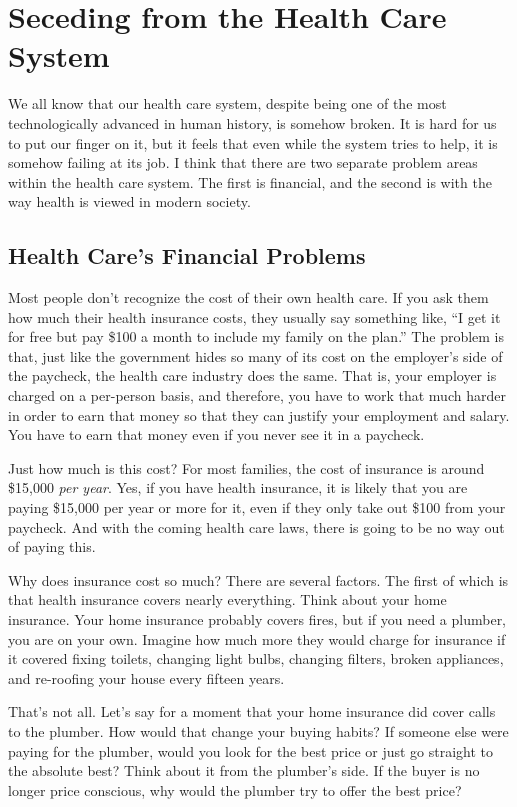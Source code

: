
\chapter{Seceding from the Health Care System}


We all know that our health care system, despite being one of the most
technologically advanced in human history, is somehow broken. It is
hard for us to put our finger on it, but it feels that even while
the system tries to
help, it is somehow failing at its job. I think that there are two
separate problem areas within the health care system. The first is
financial, and the second is with the way health is viewed in modern
society.

\section{Health Care’s Financial Problems}

Most people don’t recognize the cost of their own health care. If you
ask them how much their health insurance costs, they usually say
something like, “I get it for free but pay \$100 a month to include my
family on the plan.”  The problem is that, just like the government
hides so many of its cost on the employer’s side of the paycheck, the
health care industry does the same. That is, your employer is charged
on a per-person basis, and therefore, you have to work that much harder
in order to earn that money
so that they can
justify your employment and salary. You have to earn that money even if
you never see it in a paycheck.


Just how much is this cost?  For most families, the cost of insurance is
around \$15,000 \textit{per year}. Yes, if you have health insurance,
it is likely that you are paying \$15,000 per year or more for it, even
if they only take out \$100 from your paycheck. And with the coming
health care laws, there is going to be no way out of paying this.


Why does insurance cost so much?  There are several
factors. The first of
which is that health insurance covers nearly everything. Think about
your home insurance. Your home insurance probably covers fires, but if
you need a plumber, you are on your own. Imagine how much more they
would charge for
insurance if it covered fixing toilets, changing light bulbs, changing
filters, broken appliances, and re-roofing your house every fifteen
years. 


That’s not all. Let’s say for a moment that your home insurance did
cover calls to the plumber. How would that change your buying habits? 
If someone else were paying for the plumber, would you look for the
best price or just go straight to the absolute best?  Think about it
from the plumber’s side. If the buyer is no longer price conscious, why
would the plumber try to offer the best price? 


